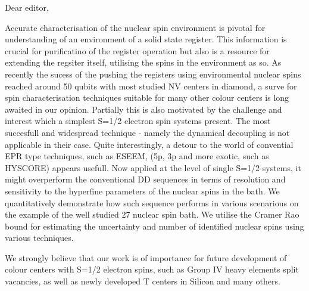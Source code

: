 \documentclass[12pt]{amsart}
\begin{document}
Dear editor,

Accurate characterisation of the nuclear spin environment is pivotal for understanding of an environment of a solid state register. 
This information is crucial for purificatino of the register operation but also is a resource for extending the regsiter itself, utilising the spins in the environment as so. 
As recently the sucess of the pushing the registers using environmental nuclear spins reached around 50 qubits with most studied NV centers in diamond, a surve for spin characterisation techniques suitable for many other colour centers is long awaited in our opinion. 
Partially this is also motivated by the challenge and interest which a simplest S=1/2 electron spin systems present. 
The most succesfull and widespread technique - namely the dynamical decoupling is not applicable in their case. 
Quite interestingly, a detour to the world of convential EPR type techniques, such as ESEEM, (5p, 3p and more exotic, such as HYSCORE) appears usefull. 
Now applied at the level of single S=1/2 systems, it might overperform the conventional DD sequences in terms of resolution and sensitivity to the hyperfine parameters of the nuclear spins in the bath.  
We quantitatively demonstrate how such sequence performs in various scenarious on the example of the well studied 27 nuclear spin bath.
We utilise the Cramer Rao bound for estimating the uncertainty and number of identified nuclear spins using various techniques. 

We strongly believe that our work is of importance for future development of colour centers with S=1/2 electron spins, such as Group IV heavy elements split vacancies, as well as newly developed T centers in Silicon and many others. 
\end{document}
